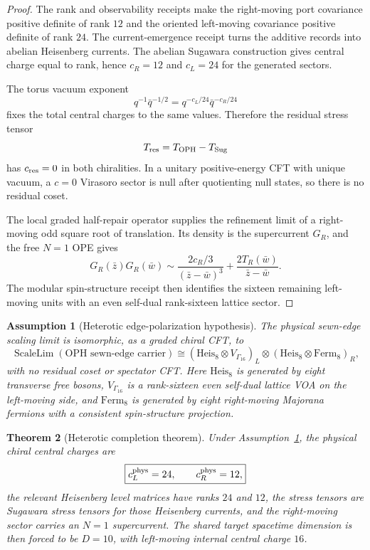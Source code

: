 \documentclass[11pt]{article}
\newtheorem{theorem}{Theorem}[section]
\newtheorem{assumption}[theorem]{Assumption}
\theoremstyle{remark}
\theoremstyle{plain}
\newcommand{\OPH}{\mathrm{OPH}}
\begin{document}
\begin{proof}
The rank and observability receipts make the right-moving port covariance positive definite of
rank \(12\) and the oriented left-moving covariance positive definite of rank \(24\). The
current-emergence receipt turns the additive records into abelian Heisenberg currents. The abelian
Sugawara construction gives central charge equal to rank, hence \(c_R=12\) and \(c_L=24\) for the
generated sectors.

The torus vacuum exponent
\[
q^{-1}\bar q^{-1/2}=q^{-c_L/24}\bar q^{-c_R/24}
\]
fixes the total central charges to the same values. Therefore the residual stress tensor
\[
T_{\rm res}=T_{\OPH}-T_{\rm Sug}
\]
has \(c_{\rm res}=0\) in both chiralities. In a unitary positive-energy CFT with unique vacuum, a
\(c=0\) Virasoro sector is null after quotienting null states, so there is no residual coset.

The local graded half-repair operator supplies the refinement limit of a right-moving odd square
root of translation. Its density is the supercurrent \(G_R\), and the free \(N=1\) OPE gives
\[
G_R(\bar z)G_R(\bar w)
\sim
\frac{2c_R/3}{(\bar z-\bar w)^3}
+
\frac{2T_R(\bar w)}{\bar z-\bar w}.
\]
The modular spin-structure receipt then identifies the sixteen remaining left-moving units with an
even self-dual rank-sixteen lattice sector.
\end{proof}

\begin{assumption}[Heterotic edge-polarization hypothesis]\label{ass:heterotic-edge-polarization}
The physical sewn-edge scaling limit is isomorphic, as a graded chiral CFT, to
\[
\operatorname{ScaleLim}(\text{OPH sewn-edge carrier})
\cong
\left(\mathrm{Heis}_8\otimes V_{\Gamma_{16}}\right)_L
\otimes
\left(\mathrm{Heis}_8\otimes \mathrm{Ferm}_8\right)_R,
\]
with no residual coset or spectator CFT. Here \(\mathrm{Heis}_8\) is generated by eight transverse
free bosons, \(V_{\Gamma_{16}}\) is a rank-sixteen even self-dual lattice VOA on the left-moving
side, and \(\mathrm{Ferm}_8\) is generated by eight right-moving Majorana fermions with a
consistent spin-structure projection.
\end{assumption}

\begin{theorem}[Heterotic completion theorem]
Under Assumption~\ref{ass:heterotic-edge-polarization}, the physical chiral central charges are
\[
\boxed{c_L^{\rm phys}=24,\qquad c_R^{\rm phys}=12,}
\]
the relevant Heisenberg level matrices have ranks \(24\) and \(12\), the stress tensors are
Sugawara stress tensors for those Heisenberg currents, and the right-moving sector carries an
\(N=1\) supercurrent. The shared target spacetime dimension is then forced to be \(D=10\), with
left-moving internal central charge \(16\).
\end{theorem}
\end{document}
